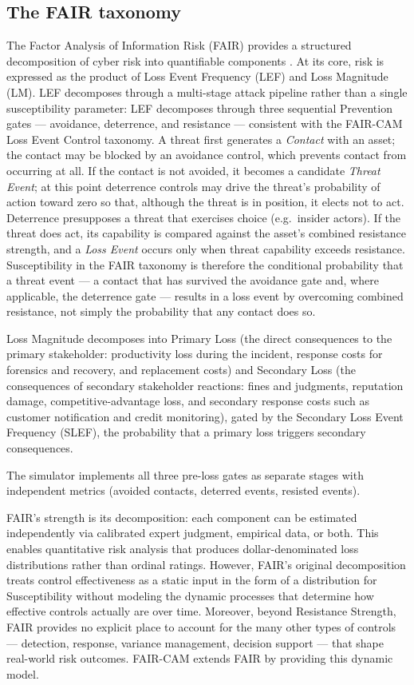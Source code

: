 \documentclass[11pt,a4paper]{article}
\begin{document}
\subsection{The FAIR taxonomy}

The Factor Analysis of Information Risk (FAIR) provides a structured decomposition of cyber risk into quantifiable components \citep{Freund2015}. At its core, risk is expressed as the product of Loss Event Frequency (LEF) and Loss Magnitude (LM). LEF decomposes through a multi-stage attack pipeline rather than a single susceptibility parameter: LEF decomposes through three sequential Prevention gates --- avoidance, deterrence, and resistance --- consistent with the FAIR-CAM Loss Event Control taxonomy. A threat first generates a \emph{Contact} with an asset; the contact may be blocked by an avoidance control, which prevents contact from occurring at all. If the contact is not avoided, it becomes a candidate \emph{Threat Event}; at this point deterrence controls may drive the threat's probability of action toward zero so that, although the threat is in position, it elects not to act. Deterrence presupposes a threat that exercises choice (e.g.\ insider actors). If the threat does act, its capability is compared against the asset's combined resistance strength, and a \emph{Loss Event} occurs only when threat capability exceeds resistance. Susceptibility in the FAIR taxonomy is therefore the conditional probability that a threat event --- a contact that has survived the avoidance gate and, where applicable, the deterrence gate --- results in a loss event by overcoming combined resistance, not simply the probability that any contact does so.

Loss Magnitude decomposes into Primary Loss (the direct consequences to the primary stakeholder: productivity loss during the incident, response costs for forensics and recovery, and replacement costs) and Secondary Loss (the consequences of secondary stakeholder reactions: fines and judgments, reputation damage, competitive-advantage loss, and secondary response costs such as customer notification and credit monitoring), gated by the Secondary Loss Event Frequency (SLEF), the probability that a primary loss triggers secondary consequences.

The simulator implements all three pre-loss gates as separate stages with independent metrics (avoided contacts, deterred events, resisted events).

FAIR's strength is its decomposition: each component can be estimated independently via calibrated expert judgment, empirical data, or both. This enables quantitative risk analysis that produces dollar-denominated loss distributions rather than ordinal ratings. However, FAIR's original decomposition treats control effectiveness as a static input in the form of a distribution for Susceptibility without modeling the dynamic processes that determine how effective controls actually are over time. Moreover, beyond Resistance Strength, FAIR provides no explicit place to account for the many other types of controls --- detection, response, variance management, decision support --- that shape real-world risk outcomes. FAIR-CAM extends FAIR by providing this dynamic model.
\end{document}
